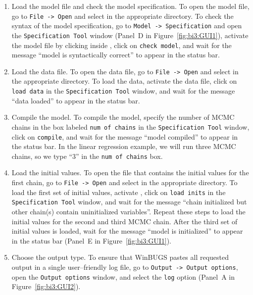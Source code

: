 \begin{enumerate}
\item Load the model file and check the model specification. To open the model file, go to \texttt{File -> Open} and select  in the appropriate directory. To check the syntax of the model specification, go to \texttt{Model -> Specification} and open the \texttt{Specification Tool} window (Panel~D in Figure~\ref{fig:bi3:GUI1}), activate the model file by clicking inside , click on \texttt{check model}, and wait for the message ``model is syntactically correct'' to appear in the status bar.

\item Load the data file. To open the data file, go to \texttt{File -> Open} and select  in the appropriate directory. To load the data, activate the data file, click on \texttt{load data} in the \texttt{Specification Tool} window, and wait for the message ``data loaded'' to appear in the status bar.

\item Compile the model. To compile the model, specify the number of MCMC chains in the box labeled \texttt{num of chains} in the \texttt{Specification Tool} window, click on \texttt{compile}, and wait for the message ``model compiled'' to appear in the status bar. In the linear regression example, we will run three MCMC chains, so we type ``3'' in the \texttt{num of chains} box.

\item Load the initial values. To open the file that contains the initial values for the first chain, go to \texttt{File -> Open} and select  in the appropriate directory. To load the first set of initial values, activate , click on \texttt{load inits} in the \texttt{Specification Tool} window, and wait for the message ``chain initialized but other chain(s) contain uninitialized variables''. Repeat these steps to load the initial values for the second and third MCMC chain. After the third set of initial values is loaded, wait for the message ``model is initialized'' to appear in the status bar (Panel~E in Figure~\ref{fig:bi3:GUI1}).

\item Choose the output type. To ensure that WinBUGS pastes all requested output in a single user--friendly log file, go to \texttt{Output -> Output options}, open the \texttt{Output options} window, and select the \texttt{log} option (Panel~A in Figure~\ref{fig:bi3:GUI2}).


\end{enumerate}
